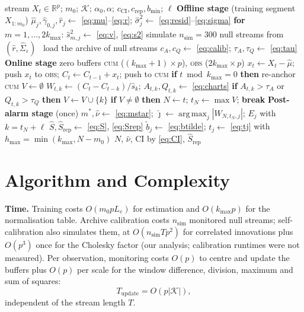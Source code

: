 \documentclass[conference]{IEEEtran}
\newcommand{\R}{\mathbb{R}}
\newcommand{\hs}{\hat{s}}
\DeclareMathOperator*{\argmax}{arg\,max}
\begin{document}
\begin{algorithm}[t]
\caption{OCD-Mix: detection and post-alarm inference}
\label{alg:ocdmix}
\small
\begin{algorithmic}[1]
\Require stream $X_t\in\R^p$; $m_0$; $\mathcal{K}$; $\alpha_0,\alpha$; $c_{\mathrm{CI}},c_{\mathrm{rep}},b_{\min}$; $\ell$
\Statex \textbf{Offline stage} (training segment $X_{1:m_0}$)
  \State $\hat\mu_j,\hat\gamma_{0,j},\hat r_j\gets$ \eqref{eq:mu}--\eqref{eq:r}; $\hat\sigma_j^2\gets$ \eqref{eq:resid}--\eqref{eq:sigma}
  \State \textbf{for} $m=1,\dots,2k_{\max}$: $\hs^2_{m,j}\gets$ \eqref{eq:v}, \eqref{eq:s2}
\EndFor
{} simulate $n_{\mathrm{sim}}=300$ null streams from $(\hat r,\hat\Sigma_\varepsilon)$
\Else\ load the archive of null streams
\EndIf
\State $c_A,c_Q\gets$ \eqref{eq:calib}; $\tau_A,\tau_Q\gets$ \eqref{eq:tau}
\Statex \textbf{Online stage}
\State zero buffers \textsc{cum} ($(k_{\max}{+}1)\times p$), \textsc{obs} ($2k_{\max}\times p$)
  \State $x_t\gets X_t-\hat\mu$; push $x_t$ to \textsc{obs}; $C_t\gets C_{t-1}+x_t$; push to \textsc{cum}
  \State \textbf{if} $t \bmod k_{\max}=0$ \textbf{then} re-anchor \textsc{cum}
  \State $V\gets\emptyset$
    \State $W_{t,k}\gets(C_t-C_{t-k})/\hs_k$; $A_{t,k},Q_{t,k}\gets$ \eqref{eq:charts}
    \State \textbf{if} $A_{t,k}>\tau_A$ or $Q_{t,k}>\tau_Q$ \textbf{then} $V\gets V\cup\{k\}$
  \EndFor
  \State \textbf{if} $V\neq\emptyset$ \textbf{then} $N\gets t$; $t_N\gets\max V$; \textbf{break}
\EndFor
\Statex \textbf{Post-alarm stage} (once)
\State $m^*,\hat\nu\gets$ \eqref{eq:mstar}; $\hat\jmath\gets\argmax_j|W_{N,t_N,j}|$; $E_j$ with $k=t_N+\ell$
\State $\hat S,\hat S_{\mathrm{rep}}\gets$ \eqref{eq:S}, \eqref{eq:Srep}
 $\tilde b_j\gets$ \eqref{eq:btilde}; $t_j\gets$ \eqref{eq:tj} with $h_{\max}=\min(k_{\max},N-m_0)$
\EndFor
\State \Return $N$, $\hat\nu$, CI by \eqref{eq:CI}, $\hat S_{\mathrm{rep}}$
\end{algorithmic}
\end{algorithm}

\section{Algorithm and Complexity}\label{sec:complexity}
\textbf{Time.} Training costs $O(m_0pL_e)$ for estimation and $O(k_{\max}p)$ for the normalisation table. Archive calibration costs $n_{\mathrm{sim}}$ monitored null streams; self-calibration also simulates them, at $O(n_{\mathrm{sim}}Tp^2)$ for correlated innovations plus $O(p^3)$ once for the Cholesky factor (our analysis; calibration runtimes were not measured). Per observation, monitoring costs $O(p)$ to centre and update the buffers plus $O(p)$ per scale for the window difference, division, maximum and sum of squares:
\begin{equation}
T_{\mathrm{update}}=O(p|\mathcal{K}|), \label{eq:time}
\end{equation}
independent of the stream length $T$.
\end{document}
